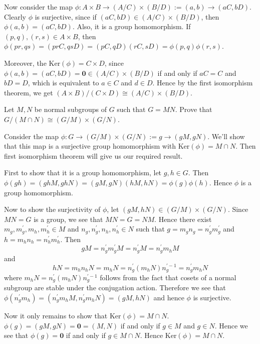 \documentclass[12pt]{exam}
\theoremstyle{plain} %
\theoremstyle{definition} %
\theoremstyle{remark} %
\begin{document}
\begin{questions}
\begin{solution}
    Now consider the map $\phi : A \times B \to (A/C) \times (B/D) := (a, b) \to (aC, bD)$. Clearly $\phi$ is surjective, since if $(aC, bD) \in (A/C)\times(B/D)$, then $\phi(a, b) = ( aC, bD)$. Also, it is a group homomorphism. If $(p, q), (r, s) \in A \times B$, then $\phi(pr, qs) = (prC, qsD) = (pC, qD)(rC, sD) = \phi(p, q)\phi(r, s)$.

    Moreover, the $\textrm{Ker}(\phi) = C \times D$, since $\phi(a, b) = (aC, bD) = \textbf{0} \in (A/C) \times (B/D)$ if and only if $aC = C$ and $bD = D$, which is equivalent to $a \in C$ and $d \in D$. Hence by the first isomorphism theorem, we get $(A \times B)/(C \times D) \cong (A/C)\times(B/D)$.
  \end{solution}

  \question
  Let $M, N$ be normal subgroups of $G$ such that $G = MN$. Prove that $G/(M\cap N) \cong (G/M) \times (G/N)$.
  \begin{solution}
    Consider the map $\phi: G \to (G/M)\times(G/N) := g \to (gM, gN)$. We'll show that this map is a surjective group homomorphism with $\textrm{Ker}(\phi) = M \cap N$. Then first isomorphism theorem will give us our required result.

    First to show that it is a group homomorphism, let $ g, h \in G$. Then $\phi(gh) = (ghM, ghN) = (gM, gN)(hM, hN) = \phi(g) \phi(h)$. Hence $\phi$ is a group homomorphism.

    Now to show the surjectivity of $\phi$, let $(gM, hN) \in (G/M)\times(G/N)$. Since $MN = G$ is a group, we see that $MN = G = NM$. Hence there exist $m_g, m^\prime_g, m_h, m^\prime_h \in M$ and $n_g, n^\prime_g, n_h, n^\prime_h \in N$ such that $g = m_gn_g = n^\prime_g m^\prime_g$ and $h = m_hn_h = n^\prime_h m^\prime_h$.
    Then $$gM = n^\prime_g m^\prime_g M  = n^\prime_gM = n^\prime_g m_h M$$
    and $$hN = m_hn_hN = m_hN = n^\prime_g (m_h N )n^{\prime-1}_g= n^\prime_gm_hN$$
    where $m_hN = n^\prime_g (m_h N )n^{\prime-1}_g$ follows from the fact that cosets of a normal subgroup are stable under the conjugation action.
    Therefore we see that $ \phi(n^\prime_gm_h) = (n^\prime_gm_hM, n^\prime_gm_hN) = (gM, hN)$ and hence $\phi$ is surjective.

    Now it only remains to show that $\textrm{Ker}(\phi) = M \cap N$. $\phi(g) = (gM, gN) =  \textbf{0} = (M, N)$ if and only if $g \in M$ and $g \in N$. Hence we see that $\phi(g) = \textbf{0}$ if and only if $g \in M \cap N$. Hence $\textrm{Ker}(\phi) = M \cap N$.
  \end{solution}


\end{questions}
\end{document}
